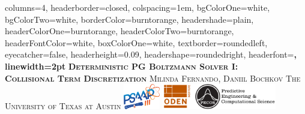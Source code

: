 \documentclass[landscape,archE,fontscale=0.285]{baposter} %
\begin{document}
\begin{poster}
{
columns=4, %
headerborder=closed, %
colspacing=1em, %
bgColorOne=white, %
bgColorTwo=white, %
borderColor=burntorange, %
headershade=plain,
headerColorOne=burntorange, %
headerColorTwo=burntorange, %
headerFontColor=white, %
boxColorOne=white, %
textborder=roundedleft, %
eyecatcher=false, %
headerheight=0.09\textheight, %
headershape=roundedright, %
headerfont=\Large\bf\textsc, %
linewidth=2pt %
}
%
{}
{\bf\textsc{Deterministic PG Boltzmann Solver I: \\{Collisional Term Discretization} }\vspace{0.5em}} %
{\textsc{Milinda Fernando, Daniil Bochkov  \hspace{12pt} The University of Texas at Austin}} %
{%
%
\hspace{12pt} \includegraphics[align=c,height=3em]{psaap3-logo.png}%
\hspace{12pt} \includegraphics[align=c,height=3em]{oden_pecos_2020_wordmark.png}%
}


\end{poster}
\end{document}
